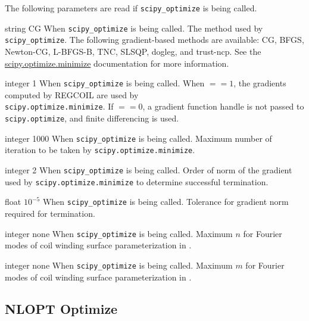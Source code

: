 The following parameters are read if \texttt{scipy\_optimize} is being called. 

{string}
{CG}
{When \texttt{scipy\_optimize} is being called.}
{The method used by \texttt{scipy\_optimize}. The following gradient-based methods are available: CG, BFGS, Newton-CG, L-BFGS-B, TNC, SLSQP, dogleg, and trust-ncp. See the \\
\href{https://docs.scipy.org/doc/scipy/reference/generated/scipy.optimize.minimize.html}{scipy.optimize.minimize} documentation for more information.}

\myhrule

{integer}
{1}
{When \texttt{scipy\_optimize} is being called.}
{When  $ == 1$, the gradients computed by REGCOIL are used by \\ \texttt{scipy.optimize.minimize}. If  $ == 0$, a gradient function handle is not passed to \texttt{scipy.optimize}, and finite differencing is used.}

\myhrule

{integer}
{1000}
{When \texttt{scipy\_optimize} is being called.}
{Maximum number of iteration to be taken by \texttt{scipy.optimize.minimize}.}

\myhrule

{integer}
{2}
{When \texttt{scipy\_optimize} is being called.}
{Order of norm of the gradient used by \texttt{scipy.optimize.minimize} to determine successful termination.}

\myhrule

{float}
{$10^{-5}$}
{When \texttt{scipy\_optimize} is being called.}
{Tolerance for gradient norm required for termination.}

\myhrule

{integer}
{none}
{When \texttt{scipy\_optimize} is being called.}
{Maximum $n$ for Fourier modes of coil winding surface parameterization in .}

\myhrule

{integer}
{none}
{When \texttt{scipy\_optimize} is being called.}
{Maximum $m$ for Fourier modes of coil winding surface parameterization in .}

\myhrule

\subsection{NLOPT Optimize}

